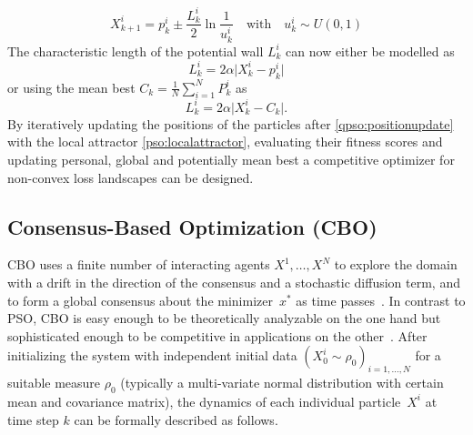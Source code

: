 \documentclass[a4paper, 11pt]{article}
\newcommand{\globmin}{x^*}
\begin{document}
\begin{equation}\label{qpso:positionupdate}
    X^i_{k+1} = p^i_{k} \pm \frac{L^i_{k}}{2} \ln{\frac{1}{u^i_{k}}} \quad \text{with} \quad u^i_{k}\sim U(0,1)
\end{equation}
The characteristic length of the potential wall $L^i_{k}$ can now either be modelled as
\begin{equation}\label{qpso:potwalllength}
    L^i_{k} = 2 \alpha \lvert X^i_{k} - p^i_{k} \rvert
\end{equation}
or using the mean best $C_k=\frac{1}{N}\sum_{i=1}^N P^i_{k}$ as
\begin{equation*}
    L^i_{k} = 2 \alpha \lvert X^i_{k} - C_k \rvert.
\end{equation*}
By iteratively updating the positions of the particles after \eqref{qpso:positionupdate} with the local attractor \eqref{pso:localattractor}, evaluating their fitness scores and updating personal, global and potentially mean best a competitive optimizer for non-convex loss landscapes can be designed.


\subsection{Consensus-Based Optimization (CBO)}
CBO uses a finite number of interacting agents $X^1,\ldots,X^N$ to explore the domain with a drift in the direction of the consensus and a stochastic diffusion term, and to form a global consensus about the minimizer~$\globmin$ as time passes~\cite{carrillo2019consensus,fornasier2020consensus_sphere_convergence,fornasier2021anisotropic,fornasier2021convergence}. In contrast to PSO, CBO is easy enough to be theoretically analyzable on the one hand but sophisticated enough to be competitive in applications on the other~\cite{carrillo2018analytical,fornasier2021consensus}.
After initializing the system with independent initial data $(X^i_{0}\sim\rho_0)_{i=1,\dots,N}$ for a suitable measure $\rho_0$ (typically a multi-variate normal distribution with certain mean and covariance matrix), the dynamics of each individual particle~$X^{i}$ at time step $k$ can be formally described as follows.
\end{document}
